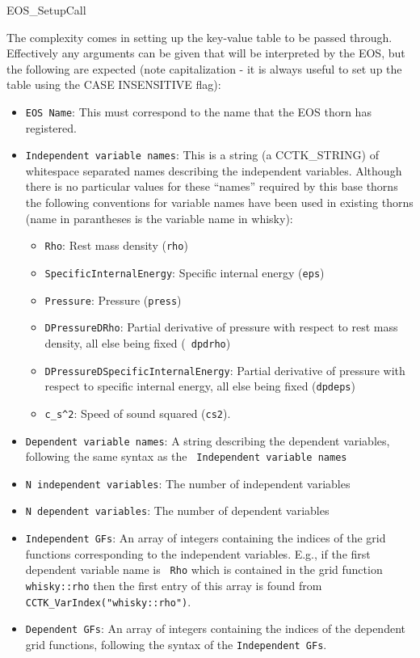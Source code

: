 \begin{FunctionDescription}{EOS\_SetupCall}
  \begin{Discussion}
    The complexity comes in setting up the key-value table to be
    passed through. Effectively any arguments can be given that will
    be interpreted by the EOS, but the following are expected (note
    capitalization - it is always useful to set up the table using the
    CASE INSENSITIVE flag):
    \begin{itemize}
    \item {\tt EOS Name}: This must correspond to the name that the
      EOS thorn has registered.
    \item {\tt Independent variable names}: This is a string (a
      CCTK\_STRING) of whitespace separated names describing the
      independent variables. Although there is no particular values
      for these ``names'' required by this base thorns the following
      conventions for variable names have been used in existing thorns
      (name in parantheses is the variable name in {\sc whisky}):
      \begin{itemize}
      \item {\tt Rho}: Rest mass density ({\tt rho})
      \item {\tt SpecificInternalEnergy}: Specific internal energy
        ({\tt eps})
      \item {\tt Pressure}: Pressure ({\tt press})
      \item {\tt DPressureDRho}: Partial derivative of pressure with
        respect to rest mass density, all else being fixed ({\tt
          dpdrho})
      \item {\tt DPressureDSpecificInternalEnergy}: Partial derivative
        of pressure with respect to specific internal energy, all else
        being fixed ({\tt dpdeps})
      \item {\tt c\_s\^{}2}: Speed of sound squared ({\tt cs2}).
      \end{itemize}
    \item {\tt Dependent variable names}: A string describing the
      dependent variables, following the same syntax as the {\tt
        Independent variable names}
    \item {\tt N independent variables}: The number of independent
      variables
    \item {\tt N dependent variables}: The number of dependent
      variables
    \item {\tt Independent GFs}: An array of integers containing the
      indices of the grid functions corresponding to the independent
      variables. E.g., if the first dependent variable name is {\tt
        Rho} which is contained in the grid function {\tt whisky::rho}
      then the first entry of this array is found from {\tt
        CCTK\_VarIndex("whisky::rho")}.
    \item {\tt Dependent GFs}: An array of integers containing the
      indices of the dependent grid functions, following the syntax of
      the {\tt Independent GFs}.
    \end{itemize}
  \end{Discussion}


\end{FunctionDescription}
